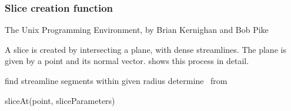 \subsubsection{Slice creation function}
\label{sec:impl:slice-creation}
{The Unix Programming Environment, by Brian Kernighan and Bob Pike}


A slice is created by intersecting a plane, with dense streamlines. The plane is given by a point and its normal vector.  shows this process in detail.


\begin{function}[tbhp]
  
  \KwIn{\point, \sliceParameters}
  \KwOut{\slice}
	\BlankLine
	
	\closeSegments \assign find streamline segments within given radius\; 
																									   \label{lin:slAt-closeSegments}
	determine \slicePlane\ from \point\;               \label{lin:slAt-plane}
	
	\Return{\slice}\;
	
\caption{sliceAt(point, sliceParameters)}
\label{fun:sliceAt}
\end{function}

